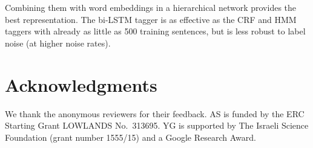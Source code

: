 \documentclass[11pt]{article}
\begin{document}
Combining them with word embeddings in a hierarchical network provides the best representation.
The bi-LSTM tagger is as effective as the CRF and HMM taggers with already as little as 500 training sentences,
but is less robust to label noise (at higher noise rates). %




\section*{Acknowledgments}

We thank the anonymous reviewers for their feedback.  
AS is funded by the ERC Starting Grant
LOWLANDS No.\ 313695. YG is supported by The Israeli Science Foundation (grant number 1555/15) and a Google Research Award. 






% 
% 
% 
% 

\end{document}
